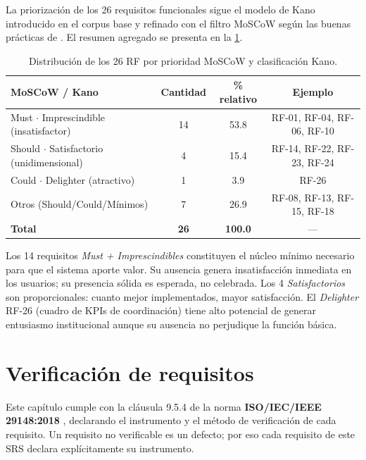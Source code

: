 \documentclass[11pt,a4paper,twoside]{report}
\begin{document}
La priorizaci\'on de los 26 requisitos funcionales sigue el modelo de Kano introducido en el corpus base y refinado con el filtro MoSCoW seg\'un las buenas pr\'acticas de \cite{pohl2010requirements}. El resumen agregado se presenta en la \cref{tab:kano}.

\begin{table}[htbp]
    \centering
    \small
    \caption{Distribuci\'on de los 26 RF por prioridad MoSCoW y clasificaci\'on Kano.}
    \label{tab:kano}
    \begin{tabular}{@{}lccc@{}}
        \toprule
        \textbf{MoSCoW / Kano} & \textbf{Cantidad} & \textbf{\% relativo} & \textbf{Ejemplo} \\
        \midrule
        Must $\cdot$ Imprescindible (insatisfactor)  & 14 & 53.8 & RF-01, RF-04, RF-06, RF-10 \\
        Should $\cdot$ Satisfactorio (unidimensional) & 4  & 15.4 & RF-14, RF-22, RF-23, RF-24 \\
        Could $\cdot$ Delighter (atractivo)           & 1  & 3.9  & RF-26 \\
        Otros (Should/Could/M\'inimos)                  & 7  & 26.9 & RF-08, RF-13, RF-15, RF-18 \\
        \midrule
        \textbf{Total}                                & \textbf{26} & \textbf{100.0} & --- \\
        \bottomrule
    \end{tabular}
\end{table}

Los 14 requisitos \emph{Must + Imprescindibles} constituyen el n\'ucleo m\'inimo necesario para que el sistema aporte valor. Su ausencia genera insatisfacci\'on inmediata en los usuarios; su presencia s\'olida es esperada, no celebrada. Los 4 \emph{Satisfactorios} son proporcionales: cuanto mejor implementados, mayor satisfacci\'on. El \emph{Delighter} RF-26 (cuadro de KPIs de coordinaci\'on) tiene alto potencial de generar entusiasmo institucional aunque su ausencia no perjudique la funci\'on b\'asica.

\chapter{Verificaci\'on de requisitos}
\label{cap:verificacion}

\begin{cajaNota}[title=Prop\'osito de este cap\'itulo]
    Este cap\'itulo cumple con la cl\'ausula 9.5.4 de la norma \textbf{ISO/IEC/IEEE 29148:2018} \cite{iso29148}, declarando el instrumento y el m\'etodo de verificaci\'on de cada requisito. Un requisito no verificable es un defecto; por eso cada requisito de este SRS declara expl\'icitamente su instrumento.
\end{cajaNota}
\end{document}
